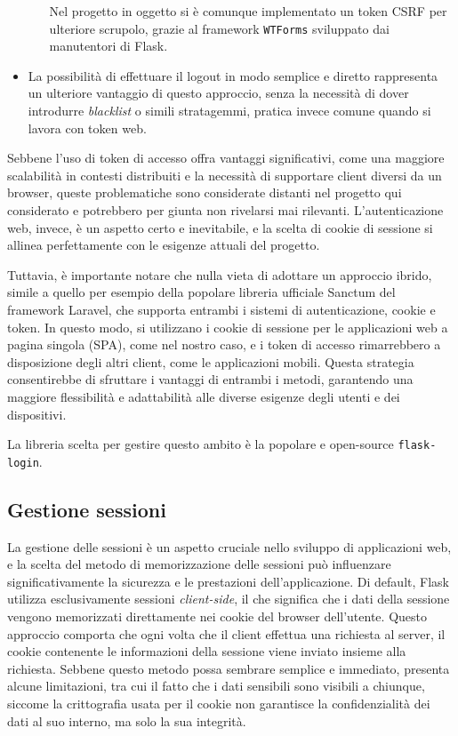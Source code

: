 \begin{itemize}
\begin{itemize}
        Nel progetto in oggetto si è comunque implementato un token CSRF per ulteriore scrupolo, grazie al framework \texttt{WTForms} sviluppato dai manutentori di Flask.
    \end{itemize}
    \item La possibilità di effettuare il logout in modo semplice e diretto rappresenta un ulteriore vantaggio di questo approccio, senza la necessità di dover introdurre \emph{blacklist} o simili stratagemmi, pratica invece comune quando si lavora con token web.
\end{itemize}

Sebbene l'uso di token di accesso offra vantaggi significativi, come una maggiore scalabilità in contesti distribuiti e la necessità di supportare client diversi da un browser, queste problematiche sono considerate distanti nel progetto qui considerato e potrebbero per giunta non rivelarsi mai rilevanti. L'autenticazione web, invece, è un aspetto certo e inevitabile, e la scelta di cookie di sessione si allinea perfettamente con le esigenze attuali del progetto.

Tuttavia, è importante notare che nulla vieta di adottare un approccio ibrido, simile a quello per esempio della popolare libreria ufficiale Sanctum del framework Laravel, che supporta entrambi i sistemi di autenticazione, cookie e token. In questo modo, si utilizzano i cookie di sessione per le applicazioni web a pagina singola (SPA), come nel nostro caso, e i token di accesso rimarrebbero a disposizione degli altri client, come le applicazioni mobili. Questa strategia consentirebbe di sfruttare i vantaggi di entrambi i metodi, garantendo una maggiore flessibilità e adattabilità alle diverse esigenze degli utenti e dei dispositivi.

La libreria scelta per gestire questo ambito è la popolare e open-source \texttt{flask-login}.

\subsection{Gestione sessioni}
La gestione delle sessioni è un aspetto cruciale nello sviluppo di applicazioni web, e la scelta del metodo di memorizzazione delle sessioni può influenzare significativamente la sicurezza e le prestazioni dell'applicazione. Di default, Flask utilizza esclusivamente sessioni \emph{client-side}, il che significa che i dati della sessione vengono memorizzati direttamente nei cookie del browser dell'utente. Questo approccio comporta che ogni volta che il client effettua una richiesta al server, il cookie contenente le informazioni della sessione viene inviato insieme alla richiesta. Sebbene questo metodo possa sembrare semplice e immediato, presenta alcune limitazioni, tra cui il fatto che i dati sensibili sono visibili a chiunque, siccome la crittografia usata per il cookie non garantisce la confidenzialità dei dati al suo interno, ma solo la sua integrità.

